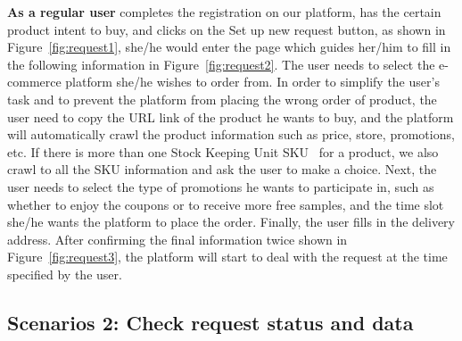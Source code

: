 \textbf{As a regular user} completes the registration on our platform, has the certain product intent to buy, and clicks on the Set up new request button, as shown in Figure~\ref{fig:request1}, she/he would enter the page which guides her/him to fill in the following information in Figure~\ref{fig:request2}. The user needs to select the e-commerce platform she/he wishes to order from. In order to simplify the user's task and to prevent the platform from placing the wrong order of product, the user need to copy the URL link of the product he wants to buy, and the platform will automatically crawl the product information such as price, store, promotions, etc. If there is more than one Stock Keeping Unit SKU~\cite{SKU} for a product, we also crawl to all the SKU information and ask the user to make a choice. Next, the user needs to select the type of promotions he wants to participate in, such as whether to enjoy the coupons or to receive more free samples, and the time slot she/he wants the platform to place the order. Finally, the user fills in the delivery address. After confirming the final information twice shown in Figure~\ref{fig:request3}, the platform will start to deal with the request at the time specified by the user.

\subsection{Scenarios 2: Check request status and data}

